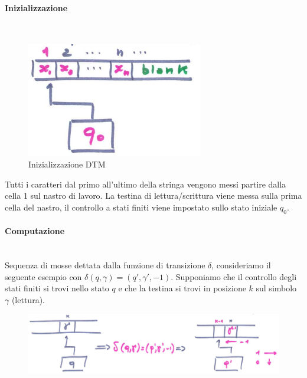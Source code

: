\documentclass{article}
\begin{document}
\paragraph{Inizializzazione}\mbox{}\\
\begin{figure}[H]
    \centering
    \includegraphics[scale=0.5]{images/dtm_init.png}
    \caption{Inizializzazione DTM}
\end{figure}
Tutti i caratteri dal primo all'ultimo della stringa vengono messi partire dalla cella 1
sul nastro di lavoro. La testina di lettura/scrittura viene messa sulla prima cella
del nastro, il controllo a stati finiti viene impostato sullo stato iniziale $q_0$.

\paragraph{Computazione}\mbox{}\\
Sequenza di mosse dettata dalla funzione di transizione $\delta$, consideriamo
il seguente esempio con $\delta(q,\gamma)=(q',\gamma',-1)$. Supponiamo che il controllo
degli stati finiti si trovi nello stato $q$ e che la testina si trovi in posizione $k$
sul simbolo $\gamma$ (lettura).

\begin{figure}[H]
    \centering
    \includegraphics[scale=0.45]{images/dtm_comp.png}
\end{figure}
\end{document}
